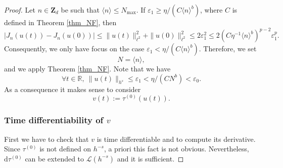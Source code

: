 \documentclass[JEP,XML,SOM,Unicode,NoEqCountersInSection,published]{cedram}
\theoremstyle{definition}
\begin{document}
\begin{proof} Let $n\in \mathbf{Z}_d$ be such that $\langle n \rangle \leq N_{\max}$. If $\varepsilon_1 \geq \eta /(C \langle n \rangle^{b})$, where $C$ is defined in Theorem \ref{thm_NF}, then
\[
|J_n(u(t))-J_n(u(0))| \leq \|u(t) \|_{\ell^2}^2 + \|u(0) \|_{\ell^2}^2 \leq 2 \varepsilon_1^2
\leq 2 (C \eta^{-1}\langle n \rangle^{b})^{p-2} \varepsilon_1^p.
\]
Consequently, we only have focus on the case $\varepsilon_1 < \eta /(C \langle n \rangle^{b})$. Therefore, we set
\[
N= \langle n \rangle,
\]
and we apply Theorem \ref{thm_NF}. Note that we have\vspace*{-3pt}
\[
\forall t \in \mathbb{R}, \ \| u(t) \|_{h^s}\leq \varepsilon_1 < \eta /(C N^{b}) <\varepsilon_0.
\]
As a consequence it makes sense to consider\vspace*{-3pt}
\[
v(t):= \tau^{(0)}(u(t)).
\]

\subsubsection*{Time differentiability of $v$}
First we have to check that $v$ is time differentiable and to compute its derivative. Since $\tau^{(0)}$ is not defined on $h^{-s}$, a priori this fact is not obvious. Nevertheless, $\mathrm{d}\tau^{(0)}$ can be extended to $\mathscr{L}(h^{-s})$ and it is sufficient.


\end{proof}
\end{document}
